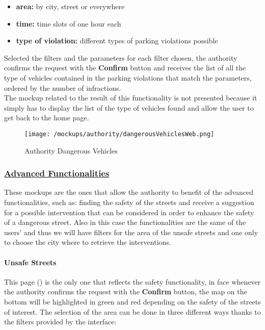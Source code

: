 				\begin{itemize}
					\item \textbf{area:} by city, street or everywhere
					\item \textbf{time:} time slots of one hour each
					\item \textbf{type of violation:} different types of parking violations possible
				\end{itemize}
			
				Selected the filters and the parameters for each filter chosen, the authority confirms the request with the \textbf{Confirm} button and receives the list of all the type of vehicles contained in the parking violations that match the parameters, ordered by the number of infractions.\\
				
				The mockup related to the result of this functionality is not presented because it simply has to display the list of the type of vehicles found and allow the user to get back to the home page.
				
				 \vspace{0.6cm}
				
				\begin{figure}[ht!]
					\centering
					\texttt{[image: /mockups/authority/dangerousVehiclesWeb.png]}
					\caption{\label{fig:dangerousVehiclesWeb} Authority Dangerous Vehicles}
				\end{figure}
			
			\subsubsection[Advanced Functionalities]{\hyperlink{toc}{Advanced Functionalities}}
				\label{sec:authorityAdvancedFunctioalites}
				
				These mockups are the ones that allow the authority to benefit of the advanced functionalities, such as: finding the safety of the streets and receive a suggestion for a possible intervention that can be considered in order to enhance the safety of a dangerous street. Also in this case the functionalities are the same of the users' and thus we will have filters for the area of the unsafe streets and one only to choose the city where to retrieve the interventions.
				
				\paragraph{Unsafe Streets}
				This page () is the only one that reflects the safety functionality, in face whenever the authority confirms the request with the \textbf{Confirm} button, the map on the bottom will be highlighted in green and red depending on the safety of the streets of interest. The selection of the area can be done in three different ways thanks to the filters provided by the interface:
				
